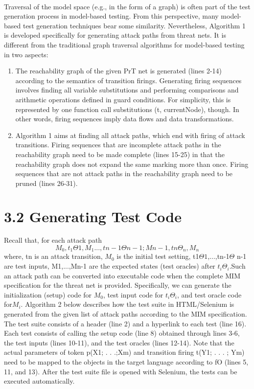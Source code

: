 \paragraph{}
Traversal of the model space (e.g., in the form of a graph)
is often part of the test generation process in model-based
testing. From this perspective, many model-based test
generation techniques bear some similarity. Nevertheless,
Algorithm 1 is developed specifically for generating attack
paths from threat nets. It is different from the traditional
graph traversal algorithms for model-based testing in
two aspects:
\begin{enumerate}
\item The reachability graph of the given PrT net
is generated (lines 2-14) according to the semantics of
transition firings. Generating firing
sequences involves finding all variable substitutions and
performing comparisons and arithmetic operations defined
in guard conditions. For simplicity, this is represented by one
function call substitutions (t, currentNode), though. In other
words, firing sequences imply data flows and data transformations.
\item Algorithm 1 aims at finding all attack
paths, which end with firing of attack transitions. Firing
sequences that are incomplete attack paths in the reachability
graph need to be made complete (lines 15-25) in that the
reachability graph does not expand the same marking more
than once. Firing sequences that are not attack paths in
the reachability graph need to be pruned (lines 26-31).
\end{enumerate}  
\section{\large 3.2 Generating Test Code}
Recall that, for each attack path $$M_0,t_1\Theta1, M_1...,tn-1\Theta n-1;
Mn-1,tn\Theta_n,M_n$$where, tn is an attack transition, $M_0$ is the initial test setting, t1$\Theta1$,...,tn-1$\Theta$ n-1 are test inputs, M1,...,Mn-1 are the expected states (test oracles) after $t_i\Theta_i$.Such an attack path can be
converted into executable code when the complete MIM specification for the threat net is provided. Specifically, we can generate the initialization (setup) code for $M_0$, test input code for $t_i\Theta_i$, and test oracle code for$M_i$. Algorithm 2 below describes how the test suite in HTML/Selenium is generated from the given
list of attack paths according to the MIM specification. The test suite consists of a header (line 2) and a hyperlink to each test (line 16). Each test consists of calling the setup code (line 8) obtained through lines 3-6, the test inputs (lines 10-11), and the test oracles (lines 12-14). Note that the actual parameters of token p(X1; . . .;Xm) and transition firing t(Y1; . . . ; Ym) need to be mapped to the objects in the target language according to fO (lines 5, 11, and 13). After the test suite file is opened with Selenium, the tests can be executed automatically.
